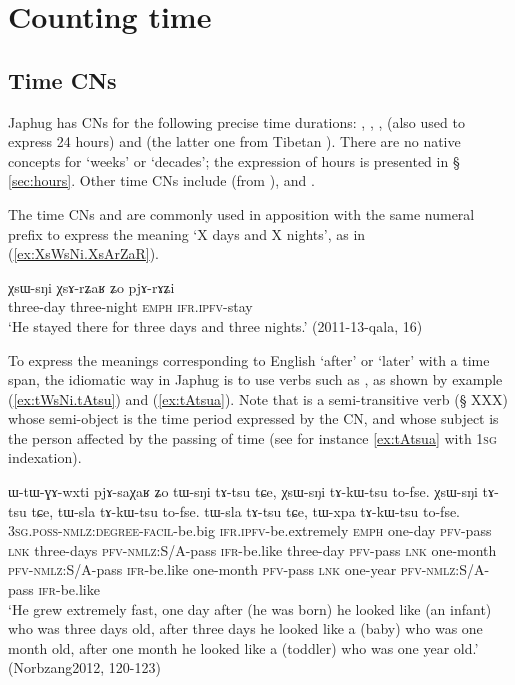 \section{Counting time} \label{sec:time}
\subsection{Time CNs} \label{sec:CN.time}
Japhug has CNs for the following precise time durations: , , ,  (also used to express 24 hours) and  (the latter one from Tibetan ). There are no native concepts for `weeks' or `decades'; the expression of hours is presented in § \ref{sec:hours}. Other time CNs include  (from ),  and .


The time CNs   and  are commonly used in apposition with the same numeral prefix to express the meaning `X days and X nights', as in (\ref{ex:XsWsNi.XsArZaR}).

\begin{exe}
\ex \label{ex:XsWsNi.XsArZaR}
\gll χsɯ-sŋi χsɤ-rʑaʁ ʑo pjɤ-rɤʑi \\
three-day three-night \textsc{emph} \textsc{ifr}.\textsc{ipfv}-stay \\
\glt `He stayed there for three days and three nights.' (2011-13-qala, 16)
\end{exe}  

To express the meanings corresponding to English `after' or `later' with a time span, the idiomatic way in Japhug is to use verbs such as , as shown by example (\ref{ex:tWsNi.tAtsu}) and (\ref{ex:tAtsua}). Note that  is a semi-transitive verb (§ XXX) whose semi-object is the time period expressed by the CN, and whose subject is the person affected by the passing of time (see for instance \ref{ex:tAtsua} with \textsc{1sg} indexation).

\begin{exe}
\ex \label{ex:tWsNi.tAtsu}
\gll ɯ-tɯ-ɣɤ-wxti pjɤ-saχaʁ ʑo tɯ-sŋi tɤ-tsu tɕe, χsɯ-sŋi tɤ-kɯ-tsu to-fse. χsɯ-sŋi tɤ-tsu tɕe, tɯ-sla tɤ-kɯ-tsu to-fse. tɯ-sla tɤ-tsu tɕe, tɯ-xpa tɤ-kɯ-tsu to-fse. \\
\textsc{3sg}.\textsc{poss}-\textsc{nmlz}:\textsc{degree}-\textsc{facil}-be.big \textsc{ifr}.\textsc{ipfv}-be.extremely \textsc{emph} one-day \textsc{pfv}-pass \textsc{lnk} three-days \textsc{pfv}-\textsc{nmlz}:S/A-pass \textsc{ifr}-be.like three-day \textsc{pfv}-pass \textsc{lnk} one-month \textsc{pfv}-\textsc{nmlz}:S/A-pass \textsc{ifr}-be.like one-month \textsc{pfv}-pass \textsc{lnk} one-year \textsc{pfv}-\textsc{nmlz}:S/A-pass \textsc{ifr}-be.like  \\
\glt `He grew extremely fast, one day after (he was born) he looked like (an infant) who was three days old, after three days he looked like a (baby) who was one month old, after one month he looked like a (toddler) who was one year old.' (Norbzang2012, 120-123)
\end{exe}



